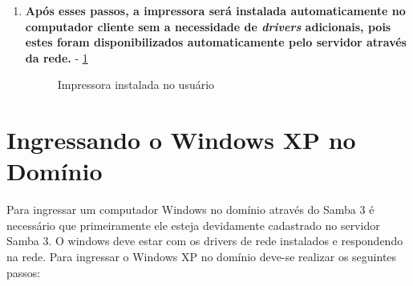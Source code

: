 \begin{enumerate}
	
	\item \textbf{Após esses passos, a impressora será instalada automaticamente no computador cliente sem a necessidade de \textit{drivers} adicionais, pois estes foram disponibilizados automaticamente pelo servidor através da rede.} - \ref{impressora_compartilhada}
	\begin{figure}[ht]
	   	\centering
	   	\caption{Impressora instalada no usuário}
	    \label{impressora_compartilhada}
	\end{figure}
	
\end{enumerate}


\section{Ingressando o Windows XP no Domínio}

Para ingressar um computador Windows no domínio através do Samba 3 é necessário que primeiramente ele esteja devidamente cadastrado no servidor Samba 3. O windows deve estar com os drivers de rede instalados e respondendo na rede.
Para ingressar o Windows XP no domínio deve-se realizar os seguintes passos:

